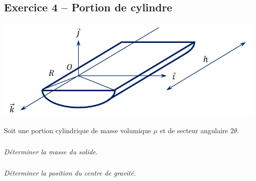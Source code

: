 \documentclass[10pt]{article}
\begin{document}
\subsection*{Exercice 4 -- Portion de cylindre}
\setcounter{subparagraph}{0}
\begin{minipage}[c]{.35\linewidth}
\begin{center}
\includegraphics[width=\textwidth]{images/portioncylindre}
\end{center}
\end{minipage} \hfill
\begin{minipage}[c]{.65\linewidth}
Soit une portion cylindrique de masse volumique $\mu$ et de secteur angulaire 2$\theta$.
\subparagraph{}
\textit{Déterminer la masse du solide.}
\subparagraph{}
\textit{Déterminer la position du centre de gravité.}
\end{minipage}
\end{document}
